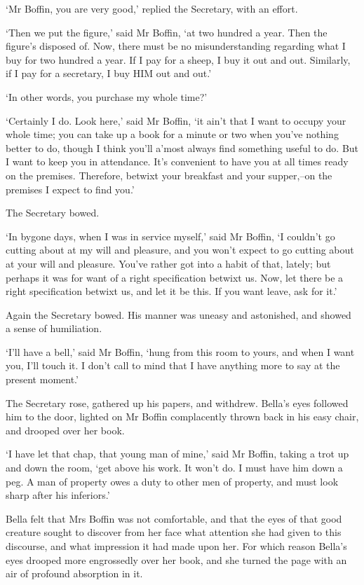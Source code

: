 ‘Mr Boffin, you are very good,’ replied the Secretary, with an effort.

‘Then we put the figure,’ said Mr Boffin, ‘at two hundred a year.
Then the figure’s disposed of. Now, there must be no misunderstanding
regarding what I buy for two hundred a year. If I pay for a sheep, I buy
it out and out. Similarly, if I pay for a secretary, I buy HIM out and
out.’

‘In other words, you purchase my whole time?’

‘Certainly I do. Look here,’ said Mr Boffin, ‘it ain’t that I want to
occupy your whole time; you can take up a book for a minute or two when
you’ve nothing better to do, though I think you’ll a’most always find
something useful to do. But I want to keep you in attendance. It’s
convenient to have you at all times ready on the premises. Therefore,
betwixt your breakfast and your supper,--on the premises I expect to
find you.’

The Secretary bowed.

‘In bygone days, when I was in service myself,’ said Mr Boffin, ‘I
couldn’t go cutting about at my will and pleasure, and you won’t expect
to go cutting about at your will and pleasure. You’ve rather got into
a habit of that, lately; but perhaps it was for want of a right
specification betwixt us. Now, let there be a right specification
betwixt us, and let it be this. If you want leave, ask for it.’

Again the Secretary bowed. His manner was uneasy and astonished, and
showed a sense of humiliation.

‘I’ll have a bell,’ said Mr Boffin, ‘hung from this room to yours,
and when I want you, I’ll touch it. I don’t call to mind that I have
anything more to say at the present moment.’

The Secretary rose, gathered up his papers, and withdrew. Bella’s eyes
followed him to the door, lighted on Mr Boffin complacently thrown back
in his easy chair, and drooped over her book.

‘I have let that chap, that young man of mine,’ said Mr Boffin, taking a
trot up and down the room, ‘get above his work. It won’t do. I must have
him down a peg. A man of property owes a duty to other men of property,
and must look sharp after his inferiors.’

Bella felt that Mrs Boffin was not comfortable, and that the eyes of
that good creature sought to discover from her face what attention she
had given to this discourse, and what impression it had made upon her.
For which reason Bella’s eyes drooped more engrossedly over her book,
and she turned the page with an air of profound absorption in it.

